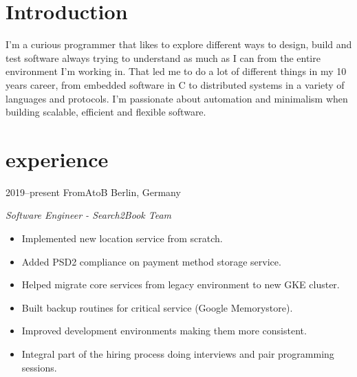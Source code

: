 \documentclass[]{friggeri-cv} %
\begin{document}
\section{Introduction}

\begin{entrylist}
\entry
{}
{}
{}
{
I'm a curious programmer that likes to explore different ways to design, build and test software
always trying to understand as much as I can from the entire environment I'm working in.
That led me to do a lot of different things in my 10 years career, from embedded
software in C to distributed systems in a variety of languages and protocols.
I'm passionate about automation and minimalism when building scalable, efficient and flexible software.
}
\end{entrylist}


\section{experience}

\begin{entrylist}
\entry
{2019--present}
{FromAtoB}
{Berlin, Germany}
{\emph{Software Engineer - Search2Book Team} \\

\begin{itemize}
  \item Implemented new location service from scratch.
  \item Added PSD2 compliance on payment method storage service.
  \item Helped migrate core services from legacy environment to new GKE cluster.
  \item Built backup routines for critical service (Google Memorystore).
  \item Improved development environments making them more consistent.
  \item Integral part of the hiring process doing interviews and pair programming sessions.
\end{itemize}

}
\end{entrylist}
\end{document}
